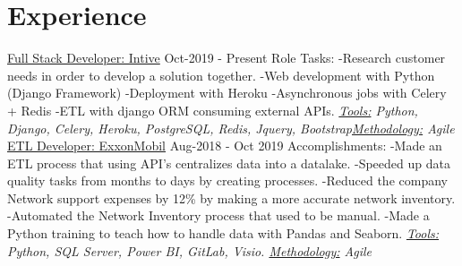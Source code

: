 \documentclass[letterpaper]{twentysecondcv} %
\begin{document}
\section{Experience}
\newline\newline 
{\large\underline{Full Stack Developer: Intive}}  \hspace*{115pt}  Oct-2019 - Present
\newline\newline
Role Tasks:
    \newline-Research customer needs in order to develop a solution together.
    \newline-Web development with Python (Django Framework)
    \newline-Deployment with Heroku
    \newline-Asynchronous jobs with Celery + Redis
    \newline-ETL with django ORM consuming external APIs.
    \newline\newline\textit{\underline{Tools:} Python, Django, Celery, Heroku, PostgreSQL, Redis, Jquery, Bootstrap\newline \underline{Methodology:} Agile}
    \newline\newline
{\large\underline{ETL Developer: ExxonMobil}}  \hspace*{115pt}  Aug-2018 - Oct 2019
\newline\newline
Accomplishments:
    \newline-Made an ETL process that using API's centralizes data into a datalake.
    \newline-Speeded up data quality tasks from months to days by creating processes.
    \newline-Reduced the company Network support expenses by 12\% by making a more accurate network inventory.
    \newline-Automated the Network Inventory process that used to be manual.
    \newline-Made a Python training to teach how to handle data with Pandas and Seaborn.
    \newline\newline\textit{\underline{Tools:} Python, SQL Server, Power BI, GitLab, Visio. \underline{Methodology:} Agile}
    \newline\newline
    
\end{document}

